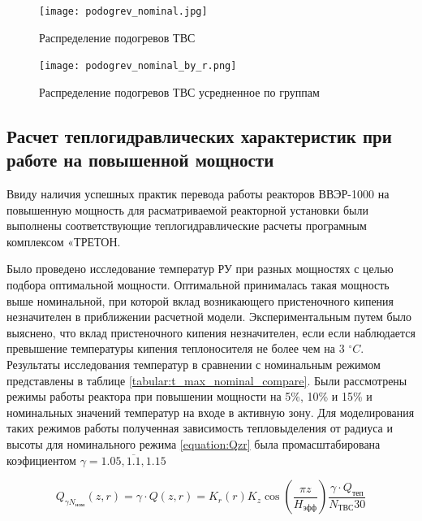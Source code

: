 \begin{figure}[H]
	\begin{center}
		\texttt{[image: podogrev\_nominal.jpg]}
		\caption{Распределение подогревов ТВС}
		\label{pic:treton-podogrev-nominal} %
	\end{center}
\end{figure}

\begin{figure}[H]
	\begin{center}
		\texttt{[image: podogrev\_nominal\_by\_r.png]}
		\caption{Распределение подогревов ТВС усредненное по группам}
		\label{pic:treton-podogrev-nominal-by-r} %
	\end{center}
\end{figure}


\subsection{Расчет теплогидравлических характеристик при работе на повышенной мощности}
Ввиду наличия успешных практик перевода работы реакторов ВВЭР-1000 на повышенную мощность для расматриваемой реакторной установки были выполнены соответствующие теплогидравлические расчеты програмным комплексом «ТРЕТОН. 

Было проведено исследование температур РУ при разных мощностях с целью подбора оптимальной мощности. Оптимальной принималась такая мощность выше номинальной, при которой вклад возникающего пристеночного кипения незначителен в приближении расчетной модели. Экспериментальным путем было выяснено, что вклад пристеночного кипения незначителен, если если наблюдается превышение температуры кипения теплоносителя не более чем на 3 $^\circ C$. Результаты исследования температур в сравнении с номинальным режимом представлены в таблице \ref{tabular:t_max_nominal_compare}. Были рассмотрены режимы работы реактора при повышении мощности на 5\%, 10\% и 15\% и номинальных значений температур на входе в активную зону. Для моделирования таких режимов работы полученная зависимость тепловыделения от радиуса и высоты для номинального режима \ref{equation:Qzr} была промасштабирована коэфициентом $\gamma = \overline{1.05, 1.1, 1.15}$


\begin{equation}
	Q_{ \gamma N_{\text{ном}}}(z,r) 
	= \gamma \cdot Q(z,r) 
	= K_r(r) K_z \cos \left( 
		\frac{\pi z}{H_{\text{эфф}}} 
	  \right) 
	  \frac{\gamma \cdot Q_{\text{теп}}}{N_{\text{ТВС}} 30}
\end{equation}

